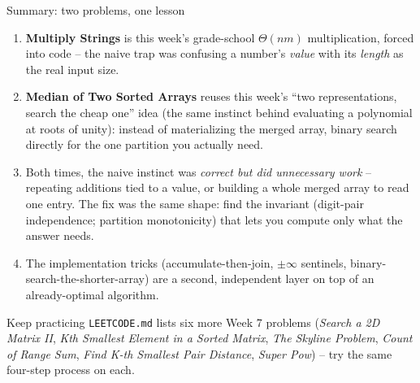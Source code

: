 \documentclass[11pt,aspectratio=169]{beamer}
\begin{document}
\begin{frame}{Summary: two problems, one lesson}
  \footnotesize
  \begin{enumerate}
    \item \textbf{Multiply Strings} is this week's grade-school $\Theta(nm)$
    multiplication, forced into code -- the naive trap was confusing a number's
    \emph{value} with its \emph{length} as the real input size.
    \item \textbf{Median of Two Sorted Arrays} reuses this week's ``two
    representations, search the cheap one'' idea (the same instinct behind evaluating a
    polynomial at roots of unity): instead of materializing the merged array, binary
    search directly for the one partition you actually need.
    \item Both times, the naive instinct was \emph{correct but did unnecessary work} --
    repeating additions tied to a value, or building a whole merged array to read one
    entry. The fix was the same shape: find the invariant (digit-pair independence;
    partition monotonicity) that lets you compute only what the answer needs.
    \item The implementation tricks (accumulate-then-join, $\pm\infty$ sentinels,
    binary-search-the-shorter-array) are a second, independent layer on top of an
    already-optimal algorithm.
  \end{enumerate}
  \begin{alertblock}{Keep practicing}
    \texttt{LEETCODE.md} lists six more Week 7 problems (\emph{Search a 2D Matrix II},
    \emph{Kth Smallest Element in a Sorted Matrix}, \emph{The Skyline Problem},
    \emph{Count of Range Sum}, \emph{Find K-th Smallest Pair Distance}, \emph{Super
    Pow}) -- try the same four-step process on each.
  \end{alertblock}
\end{frame}
\end{document}

